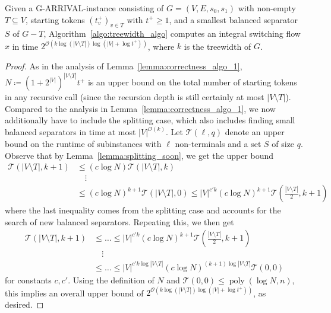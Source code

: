 \documentclass[a4paper,UKenglish,cleveref, autoref, thm-restate]{lipics-v2021}
\newcommand{\bigO}{\mathcal{O}}
\DeclareMathOperator{\poly}{poly}
\newcommand{\problem}[1]{\textrm{#1}}
\newcommand{\garrival}{\problem{G-ARRIVAL}}
\begin{document}
\begin{theorem}
    Given a \garrival-instance consisting of $G = (V, E, s_0, s_1)$ with non-empty $T \subseteq V$, starting tokens $(t^+_v)_{v \in T}$ with $t^+ \geq 1$, and a smallest balanced separator $S$ of $G - T$, Algorithm~\ref{algo:treewidth_algo} computes an integral switching flow $x$ in time $2^{\bigO \left(k \log (|V \setminus T|) \log (|V | + \log t^+) \right)}$, where $k$ is the treewidth of $G$.
\end{theorem}
\begin{proof}
    As in the analysis of Lemma~\ref{lemma:correctness_algo_1}, $N  \coloneqq (1 + 2^{|V|})^{|V \setminus T|} t^+$ is an upper bound on the total number of starting tokens in any recursive call (since the recursion depth is still certainly at most $|V \setminus T|$). Compared to the analysis in Lemma~\ref{lemma:correctness_algo_1}, we now additionally have to include the splitting case, which also includes finding small balanced separators in time at most $|V|^{\bigO(k)}$. Let $\mathcal{T}(\ell, q)$ denote an upper bound on the runtime of subinstances with $\ell$ non-terminals and a set $S$ of size $q$. Observe that by Lemma~\ref{lemma:splitting_soon}, we get the upper bound
    \begin{align*}
        \mathcal{T}(|V \setminus T|, k + 1) &\leq (c \log N) \mathcal{T}(|V \setminus T|, k) \\
        &\quad \vdots \\
        &\leq (c \log N)^{k + 1} \mathcal{T}(|V \setminus T|, 0) \leq |V|^{c' k} (c \log N)^{k + 1} \mathcal{T} \left( \frac{|V \setminus T|}{2}, k + 1 \right)
    \end{align*}
    where the last inequality comes from the splitting case and accounts for the search of new balanced separators. Repeating this, we then get 
    \begin{align*}
        \mathcal{T}(|V \setminus T|, k + 1) &\leq \dots \leq |V|^{c' k} (c \log N)^{k + 1} \mathcal{T} \left( \frac{|V \setminus T|}{2}, k + 1 \right) \\ 
        &\quad \vdots \\
        &\leq \dots \leq |V|^{c' k \log{|V \setminus T|}} (c \log N)^{(k + 1) \log{|V \setminus T|} } \mathcal{T} \left( 0, 0 \right) 
    \end{align*}
    for constants $c, c'$. Using the definition of $N$ and $\mathcal{T} \left( 0, 0 \right) \leq \poly(\log N, n)$, this implies an overall upper bound of $2^{\bigO \left(k \log (|V \setminus T|) \log (|V | + \log t^+) \right)}$, as desired.
\end{proof}
\end{document}
